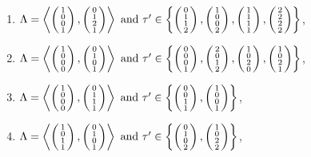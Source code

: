 \begin{prop}
\begin{enumerate}
\item
$\Lambda=\plan{1\\0\\0\\1}{0\\1\\2\\1} \text{ and } \tau' \in \left\{ \vect{0\\1\\1\\2},\vect{1\\0\\0\\2},\vect{1\\1\\1\\1},\vect{2\\2\\2\\2} \right\}$,

\item 
$\Lambda=\plan{1\\0\\0\\0}{0\\1\\0\\1} \text{ and } \tau' \in \left\{ \vect{0\\0\\0\\1},\vect{2\\0\\1\\2},\vect{1\\0\\2\\0},\vect{1\\0\\2\\1} \right\}$,
\item
$\Lambda=\plan{1\\0\\0\\0}{0\\1\\1\\1} \text{ and } \tau' \in \left\{ \vect{0\\0\\1\\1},\vect{1\\0\\0\\1} \right\}$,

\item
$\Lambda=\plan{1\\0\\1\\1}{0\\1\\0\\1} \text{ and } \tau' \in \left\{ \vect{0\\1\\0\\2},\vect{1\\0\\2\\2} \right\}$,


\end{enumerate}
\end{prop}
